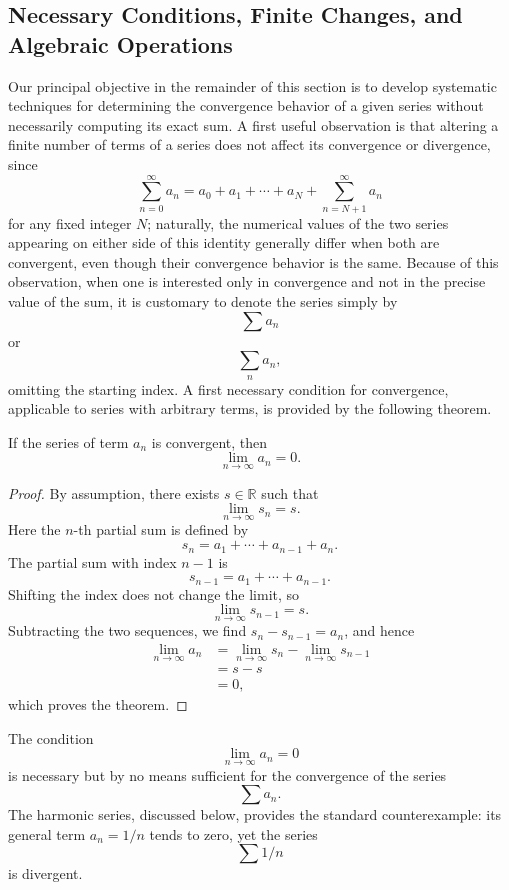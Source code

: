 \subsection{Necessary Conditions, Finite Changes, and Algebraic Operations}

Our principal objective in the remainder of this section is to develop systematic techniques for determining the convergence behavior of a given series without necessarily computing its exact sum. A first useful observation is that altering a finite number of terms of a series does not affect its convergence or divergence, since \[
\sum_{n=0}^{\infty} a_n = a_0 + a_1 + \cdots + a_N + \sum_{n=N+1}^{\infty} a_n
\] for any fixed integer $N$; naturally, the numerical values of the two series appearing on either side of this identity generally differ when both are convergent, even though their convergence behavior is the same. Because of this observation, when one is interested only in convergence and not in the precise value of the sum, it is customary to denote the series simply by \[
\sum a_n
\] or
\[
\sum_n a_n,
\]
omitting the starting index. A first necessary condition for convergence, applicable to series with arbitrary terms, is provided by the following theorem.

\begin{theorem}
If the series of term $a_n$ is convergent, then
\[
\lim_{n \to \infty} a_n = 0.
\]

\end{theorem}

\begin{proof}
By assumption, there exists $s \in \mathbb{R}$ such that
\[
\lim_{n \to \infty} s_n = s.
\]
Here the $n$-th partial sum is defined by
\[
s_n = a_1 + \cdots + a_{n-1} + a_n.
\]
The partial sum with index $n-1$ is
\[
s_{n-1} = a_1 + \cdots + a_{n-1}.
\]
Shifting the index does not change the limit, so
\[
\lim_{n \to \infty} s_{n-1} = s.
\]
Subtracting the two sequences, we find $s_n - s_{n-1} = a_n$, and hence
\[
\begin{aligned}
\lim_{n \to \infty} a_n &= \lim_{n \to \infty} s_n - \lim_{n \to \infty} s_{n-1} \\
&= s - s \\
&= 0,
\end{aligned}
\]
which proves the theorem.
\end{proof}

\begin{remark}
The condition \[
\lim_{n \to \infty} a_n = 0
\] is necessary but by no means sufficient for the convergence of the series \[
\sum a_n.
\] The harmonic series, discussed below, provides the standard counterexample: its general term $a_n = 1/n$ tends to zero, yet the series \[
\sum 1/n
\] is divergent.
\end{remark}


